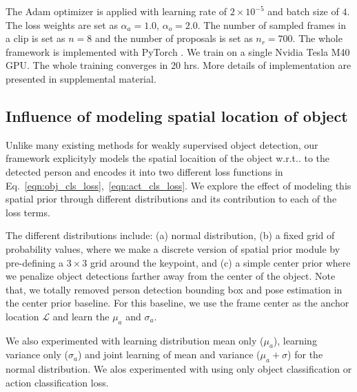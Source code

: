 \documentclass[10pt,twocolumn,letterpaper]{article}
\makeatletter
\newcommand{\scr}[1]{{\mathcal #1}}
\DeclareRobustCommand\onedot{\futurelet\@let@token\@onedot}
\def\onedot{\ifx\@let@token.\else.\null\fi\xspace}
\def\wrt{w.r.t\onedot}
\makeatother
\begin{document}
The Adam optimizer \cite{kingma2014adam} is applied with learning rate of $2\times 10^{-5}$ and batch size of $4$. The loss weights are set as $\alpha_a=1.0$, $\alpha_o=2.0$.
The number of sampled frames in a clip is set as $n=8$ and the number of proposals is set as $n_r=700$. The whole framework is implemented with PyTorch \cite{paszke2017automatic}. We train on a single Nvidia Tesla M40 GPU. The whole training converges in 20 hrs. More details of implementation are presented in supplemental material.


\vspace{-0.3\baselineskip}
\subsection{Influence of modeling spatial location of object}
\vspace{-0.4\baselineskip}
\label{sec:ablation}

Unlike many existing methods for weakly supervised object detection, our framework explicityly models the spatial locaition of the object \wrt to the detected person and encodes it into two different loss functions in Eq.~\ref{eqn:obj_cls_loss},~\ref{eqn:act_cls_loss}. We explore the effect of modeling this spatial prior through different distributions and its contribution to each of the loss terms.

The different distributions include:  (a) normal distribution, (b) a fixed grid of probability values, where we make a discrete version of spatial prior module by pre-defining a $3\times 3$ grid around the keypoint, and (c) a simple center prior where we penalize object detections farther away from the center of the object. Note that, we totally removed person detection bounding box and pose estimation in the center prior baseline. For this baseline, we use the frame center as the anchor location $\scr{L}$ and learn the $\mu_a$ and $\sigma_a$.

We also experimented with learning distribution mean only ($\mu_a$), learning variance only ($\sigma_a$) and joint learning of mean and variance ($\mu_a+\sigma$) for the normal distribution. We alos experimented with using only object classification or action classification loss.
\end{document}
